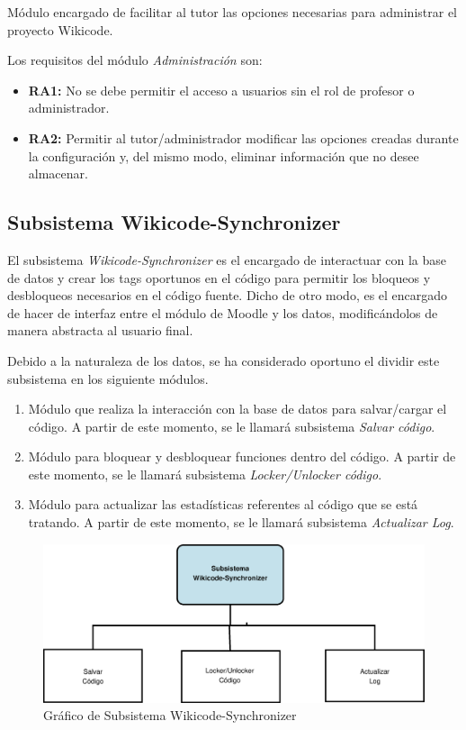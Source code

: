 Módulo encargado de facilitar al tutor las opciones necesarias para administrar el proyecto Wikicode.

Los requisitos del módulo \emph{Administración} son:

\begin{itemize}
	\item \textbf{RA1:} No se debe permitir el acceso a usuarios sin el rol de profesor o administrador.
	\item \textbf{RA2:} Permitir al tutor/administrador modificar las opciones creadas durante la configuración y, del mismo modo, eliminar información que no desee almacenar.
\end{itemize}
	
\subsection{Subsistema Wikicode-Synchronizer}

El subsistema \emph{Wikicode-Synchronizer} es el encargado de interactuar con la base de datos y crear los tags oportunos en el código para permitir los bloqueos y desbloqueos necesarios en el código fuente. Dicho de otro modo, es el encargado de hacer de interfaz entre el módulo de Moodle y los datos, modificándolos de manera abstracta al usuario final.

Debido a la naturaleza de los datos, se ha considerado oportuno el dividir este subsistema en los siguiente módulos.

\begin{enumerate}
	\item Módulo que realiza la interacción con la base de datos para salvar/cargar el código. A partir de este momento, se le llamará subsistema \emph{Salvar código}.
	\item Módulo para bloquear y desbloquear funciones dentro del código. A partir de este momento, se le llamará subsistema \emph{Locker/Unlocker código}.
	\item Módulo para actualizar las estadísticas referentes al código que se está tratando. A partir de este momento, se le llamará subsistema \emph{Actualizar Log}.
\end{enumerate}

\begin{figure}[h]
	\includegraphics[width=\textwidth]{./img/c3-sub-syn.eps}
	\caption{Gráfico de Subsistema Wikicode-Synchronizer}
\end{figure}

